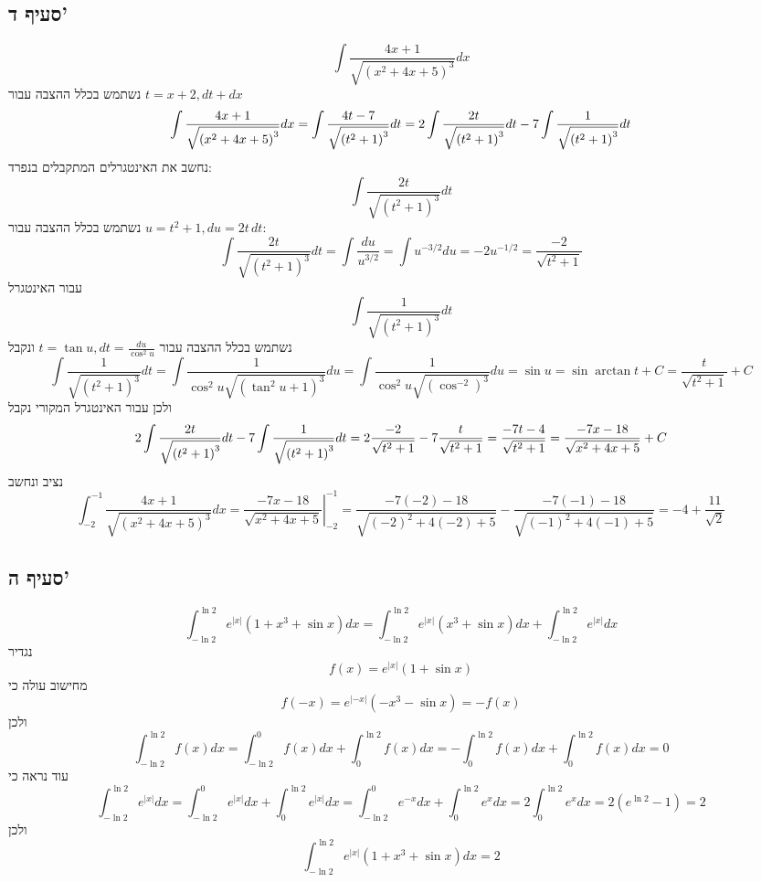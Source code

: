 \subsection{סעיף ד'}
\[
	\int \frac{4x + 1}{\sqrt{{(x^2 + 4x + 5)}^3}} dx
\]
נשתמש בכלל ההצבה עבור $t = x + 2, dt + dx$
\[
	\int \frac{4x + 1}{\sqrt{{(x^2 + 4x + 5)}^3}} dx
	= \int \frac{4t - 7}{\sqrt{{(t^2 + 1)}^3}} dt \\
	= 2\int \frac{2t}{\sqrt{{(t^2 + 1)}^3}} dt - 7\int \frac{1}{\sqrt{{(t^2 + 1)}^3}} dt \\
\]
נחשב את האינטגרלים המתקבלים בנפרד:
\[
	\int \frac{2t}{\sqrt{{(t^2 + 1)}^3}} dt
\]
נשתמש בכלל ההצבה עבור $u = t^2 + 1, du = 2t \, dt$:
\[
	\int \frac{2t}{\sqrt{{(t^2 + 1)}^3}} dt
	= \int \frac{du}{u^{3/2}}
	= \int u^{-3/2} du
	= -2 u^{-1/2}
	= \frac{-2}{\sqrt{t^2 + 1}}
\]
עבור האינטגרל
\[
	\int \frac{1}{\sqrt{{(t^2 + 1)}^3}} dt
\]
נשתמש בכלל ההצבה עבור $t = \tan u, dt = \frac{du}{\cos^2 u}$ ונקבל
\[
	\int \frac{1}{\sqrt{{(t^2 + 1)}^3}} dt
	= \int \frac{1}{\cos^2 u \sqrt{{(\tan^2 u + 1)}^3}} du
	= \int \frac{1}{\cos^2 u \sqrt{{(\cos^{-2})}^3}} du
	= \sin u = \sin \arctan t + C
	= \frac{t}{\sqrt{t^2 + 1}} + C
\]
ולכן עבור האינטגרל המקורי נקבל
\[
	2\int \frac{2t}{\sqrt{{(t^2 + 1)}^3}} dt - 7\int \frac{1}{\sqrt{{(t^2 + 1)}^3}} dt \\
	= 2 \frac{-2}{\sqrt{t^2 + 1}} - 7 \frac{t}{\sqrt{t^2 + 1}}
	= \frac{-7t - 4}{\sqrt{t^2 + 1}}
	= \frac{-7x - 18}{\sqrt{x^2 + 4x + 5}} + C
\]
נציב ונחשב
\[
	\int_{-2}^{-1} \frac{4x + 1}{\sqrt{{(x^2 + 4x + 5)}^3}} dx
	= \left. \frac{-7x - 18}{\sqrt{x^2 + 4x + 5}} \right|_{-2}^{-1}
	= \frac{-7(-2) - 18}{\sqrt{{(-2)}^2 + 4 (-2) + 5}} - \frac{-7(-1) - 18}{\sqrt{{(-1)}^2 + 4 (-1) + 5}}
	= -4 + \frac{11}{\sqrt{2}}
\]

\subsection{סעיף ה'}
\[
	\int_{-\ln 2}^{\ln 2} e^{|x|} (1 + x^3 + \sin x) dx
	= \int_{-\ln 2}^{\ln 2} e^{|x|} (x^3 + \sin x) dx
	+ \int_{-\ln 2}^{\ln 2} e^{|x|} dx
\]
נגדיר
\[
	f(x) = e^{|x|} (1 + \sin x)
\]
מחישוב עולה כי
\[
	f(-x) = e^{|-x|} (-x^3 - \sin x) = - f(x)
\]
ולכן
\[
	\int_{-\ln 2}^{\ln 2} f(x) dx
	= \int_{-\ln 2}^{0} f(x) dx + \int_{0}^{\ln 2} f(x) dx
	= -\int_{0}^{\ln 2} f(x) dx + \int_{0}^{\ln 2} f(x) dx
	= 0
\]
עוד נראה כי
\[
	\int_{-\ln 2}^{\ln 2} e^{|x|} dx
	= \int_{-\ln 2}^{0} e^{|x|} dx + \int_{0}^{\ln 2} e^{|x|} dx
	= \int_{-\ln 2}^{0} e^{-x} dx + \int_{0}^{\ln 2} e^{x} dx
	= 2\int_{0}^{\ln 2} e^{x} dx
	= 2 (e^{\ln 2} - 1) = 2
\]
ולכן
\[
	\int_{-\ln 2}^{\ln 2} e^{|x|} (1 + x^3 + \sin x) dx = 2
\]

